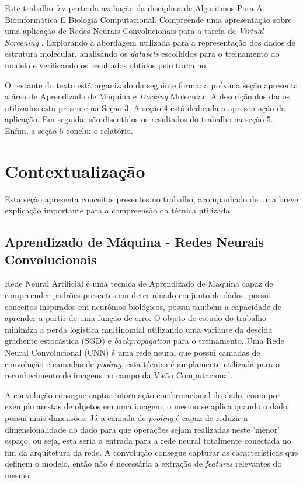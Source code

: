 \documentclass[utf8]{frontiersSCNS} %
\begin{document}
Este trabalho faz parte da avaliação da disciplina de Algoritmos Para A Bioinformática E Biologia Computacional. Compreende uma apresentação sobre uma aplicação de Redes Neurais Convolucionais para a tarefa de \textit{Virtual Screening} \cite{plscnn}. Explorando a abordagem utilizada para a representação dos dados de estrutura molecular, analisando os \textit{datasets} escolhidos para o treinamento do modelo e verificando os resultados obtidos pelo trabalho. 


O restante do texto está organizado da seguinte forma: a próxima seção apresenta a área de Aprendizado de Máquina e \textit{Docking} Molecular. A descrição dos dados utilizados esta presente na Seção 3. A seção 4 está dedicada a apresentação da aplicação. Em seguida, são discutidos os resultados do trabalho na seção 5. Enfim, a seção 6 conclui o relatório.

\section{Contextualização} %

Esta seção apresenta conceitos presentes no trabalho, acompanhado de uma breve explicação importante para a compreensão da técnica utilizada. 

\subsection{Aprendizado de Máquina - Redes Neurais Convolucionais}

Rede Neural Artificial \cite{neural_networks} é uma técnica de Aprendizado de Máquina capaz de compreender padrões presentes em determinado conjunto de dados, possui conceitos inspirados em neurônios biológicos, possui também a capacidade de aprender a partir de uma função de erro. O objeto de estudo do trabalho minimiza a perda logística multinomial utilizando uma variante da descida gradiente estocástica (SGD) e \textit{backpropagation} para o treinamento. Uma Rede Neural Convolucional (CNN) \cite{lecun2015deep} é uma rede neural que possui camadas de convolução e camadas de \textit{pooling}, esta técnica é amplamente utilizada para o reconhecimento de imagens no campo da Visão Computacional\cite{lecun2015deep}. 

A convolução consegue captar informação conformacional do dado, como por exemplo arestas de objetos em uma imagem, o mesmo se aplica quando o dado possui mais dimensões. Já a camada de \textit{pooling} é capaz de reduzir a dimensionalidade do dado para que operações sejam realizadas neste 'menor' espaço, ou seja, esta seria a entrada para a rede neural totalmente conectada no fim da arquitetura da rede. A convolução consegue capturar as características que definem o modelo, então não é necessária a extração de \textit{features} relevantes do mesmo.
\end{document}

